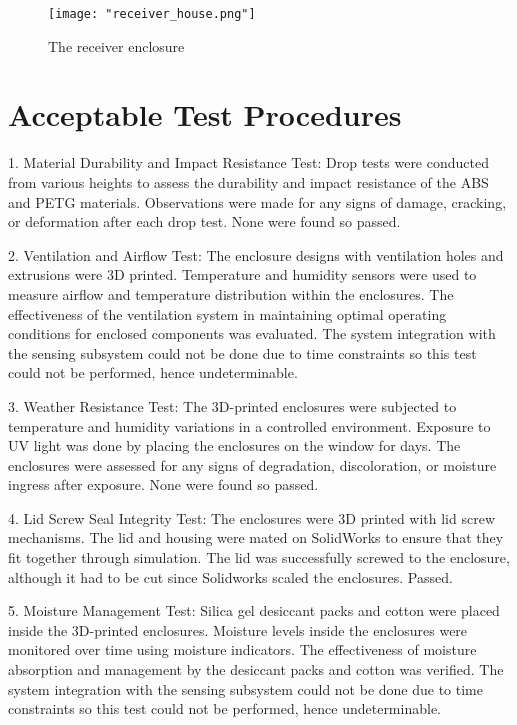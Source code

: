 \documentclass[class=report,11pt,crop=false]{standalone}
\begin{document}
 
\begin{figure}[H]
    \centering
    \texttt{[image: "receiver\_house.png"]}
    \caption{The receiver enclosure}
    \label{fig:enter-label5}
\end{figure}




 

\section{Acceptable Test Procedures}
 
1. Material Durability and Impact Resistance Test:
 Drop tests were conducted from various heights to assess the durability and impact resistance of the ABS and PETG materials. Observations were made for any signs of damage, cracking, or deformation after each drop test. None were found so passed. 
 \newline
 

2. Ventilation and Airflow Test:
    The enclosure designs with ventilation holes and extrusions were 3D printed. Temperature and humidity sensors were used to measure airflow and temperature distribution within the enclosures.
    The effectiveness of the ventilation system in maintaining optimal operating conditions for enclosed components was evaluated. The system integration with the sensing subsystem could not be done due to time constraints so this test could not be performed, hence undeterminable.
    \newline

3. Weather Resistance Test:
    The 3D-printed enclosures were subjected to temperature and humidity variations in a controlled environment. Exposure to UV light was done by placing the enclosures on the window for days. The enclosures were assessed for any signs of degradation, discoloration, or moisture ingress after exposure. None were found so passed.
    \newline

4. Lid Screw Seal Integrity Test:
    The enclosures were 3D printed with lid screw mechanisms. The lid and housing were mated on SolidWorks to ensure that they fit together through simulation. The lid was successfully screwed to the enclosure, although it had to be cut since Solidworks scaled the enclosures. Passed.
    \newline
    

5. Moisture Management Test:
 Silica gel desiccant packs and cotton were placed inside the 3D-printed enclosures. Moisture levels inside the enclosures were monitored over time using moisture indicators. The effectiveness of moisture absorption and management by the desiccant packs and cotton was verified. The system integration with the sensing subsystem could not be done due to time constraints so this test could not be performed, hence undeterminable.
\newline
\end{document}
